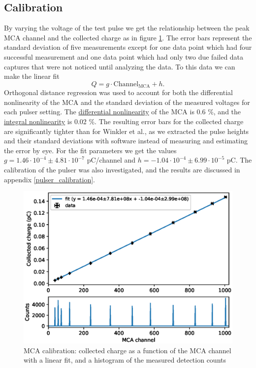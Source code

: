 \documentclass[a4paper]{article}
\begin{document}
\subsection{Calibration}
\label{results_calibration}
By varying the voltage of the test pulse we get the relationship between the peak MCA channel and the collected charge as in figure \ref{fig:mca_calibration}.
The error bars represent the standard deviation of five measurements except for one data point which had four successful measurement and one data point which had only two due failed data captures that were not noticed until analyzing the data.
To this data we can make the linear fit
\begin{equation}
Q = g \cdot \text{Channel}_\text{MCA} + h.
\label{eq:calibration}
\end{equation}
Orthogonal distance regression was used to account for both the differential nonlinearity of the MCA and the standard deviation of the measured voltages for each pulser setting.
The
\href{https://en.wikipedia.org/wiki/Differential_nonlinearity}{differential nonlinearity}
of the MCA is 0.6 \%, and the
\href{https://en.wikipedia.org/wiki/Integral_nonlinearity}{integral nonlinearity}
is 0.02 \%.
The resulting error bars for the collected charge are significantly tighter than for Winkler et al., as we extracted the pulse heights and their standard deviations with software instead of measuring and estimating the error by eye.
For the fit parameters we get the values $g = 1.46 \cdot 10^{-4} \pm 4.81 \cdot 10^{-7}$ pC/channel and $h = -1.04 \cdot 10^{-4} \pm 6.99 \cdot 10^{-5}$ pC.
The calibration of the pulser was also investigated, and the results are discussed in appendix \ref{pulser_calibration}.


\begin{figure}[ht!]
\centering
\includegraphics[width=\textwidth]{fig/python/mca_calibration.eps}
\caption{MCA calibration: collected charge as a function of the MCA channel with a linear fit, and a histogram of the measured detection counts}
\label{fig:mca_calibration}
\end{figure}
\end{document}

